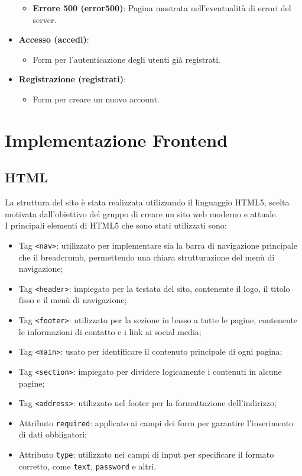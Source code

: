 \documentclass[a4paper, 12pt]{article}
\begin{document}
\begin{justify}
\begin{itemize}
\begin{itemize}
            \item \textbf{Errore 500 (error500)}: Pagina mostrata nell'eventualità di errori del server.
        \end{itemize}
    \item \textbf{Accesso (accedi)}:
        \begin{itemize}
            \item Form per l'autenticazione degli utenti già registrati.
        \end{itemize}
    \item \textbf{Registrazione (registrati)}:
        \begin{itemize}
            \item Form per creare un nuovo account.
        \end{itemize}
\end{itemize}


\section{Implementazione Frontend}

\subsection{HTML}

La struttura del sito è stata realizzata utilizzando il linguaggio HTML5, scelta motivata dall'obiettivo del gruppo di creare un sito web moderno e attuale.\\
I principali elementi di HTML5 che sono stati utilizzati sono:
\begin{itemize}
    \item Tag \texttt{<nav>}: utilizzato per implementare sia la barra di navigazione principale che il breadcrumb, permettendo una chiara strutturazione del menù di navigazione;
    \item Tag \texttt{<header>}: impiegato per la testata del sito, contenente il logo, il titolo fisso e il menù di navigazione;
    \item Tag \texttt{<footer>}: utilizzato per la sezione in basso a tutte le pagine, contenente le informazioni di contatto e i link ai social media;
    \item Tag \texttt{<main>}: usato per identificare il contenuto principale di ogni pagina;
    \item Tag \texttt{<section>}: impiegato per dividere logicamente i contenuti in alcune pagine;
    \item Tag \texttt{<address>}: utilizzato nel footer per la formattazione dell'indirizzo;
    \item Attributo \texttt{required}: applicato ai campi dei form per garantire l'inserimento di dati obbligatori;
    \item Attributo \texttt{type}: utilizzato nei campi di input per specificare il formato corretto, come \texttt{text}, \texttt{password} e altri.
\end{itemize}


\end{justify}
\end{document}
